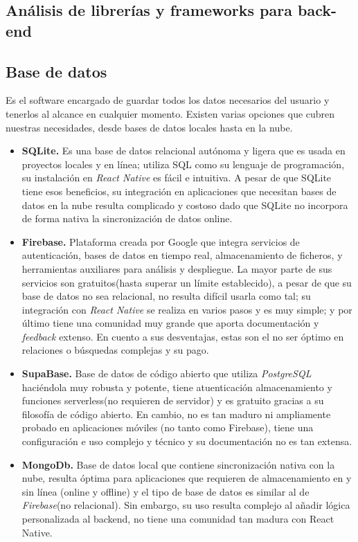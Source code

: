 \documentclass[twoside, openright, 11pt]{report}
\begin{document}
\begin{enumerate}
  
	\section{Análisis de librerías y frameworks para back-end}
		
		\subsection{Base de datos}
		Es el software encargado de guardar todos los datos necesarios del usuario y tenerlos al alcance en cualquier momento. Existen varias opciones que cubren nuestras necesidades, desde bases de datos locales hasta en la nube.
		\begin{itemize}
			\item \textbf{SQLite.} Es una base de datos relacional autónoma y ligera que es usada en proyectos locales y en línea; utiliza SQL como su lenguaje de programación, su instalación en \textit{React Native} es fácil e intuitiva. A pesar de que SQLite tiene esos beneficios, su integración en aplicaciones que necesitan bases de datos en la nube resulta complicado y costoso dado que SQLite no incorpora de forma nativa la sincronización de datos online.
			\item \textbf{Firebase.} Plataforma creada por Google que integra servicios de autenticación, bases de datos en tiempo real, almacenamiento de ficheros, y herramientas auxiliares para análisis y despliegue. La mayor parte de sus servicios son gratuitos(hasta superar un límite establecido), a pesar de que su base de datos no sea relacional, no resulta difícil usarla como tal; su integración con \textit{React Native} se realiza en varios pasos y es muy simple; y por último tiene una comunidad muy grande que aporta documentación y \textit{feedback} extenso. En cuento a sus desventajas, estas son el no ser óptimo en relaciones o búsquedas complejas y su pago.
			\item \textbf{SupaBase. } Base de datos de código abierto que utiliza 
			\textit{PostgreSQL} haciéndola muy robusta y potente, tiene atuenticación almacenamiento y funciones serverless(no requieren de servidor) y es gratuito gracias a su filosofía de código abierto. En cambio, no es tan maduro ni ampliamente probado en aplicaciones móviles (no tanto como Firebase), tiene una configuración e uso complejo y técnico y su documentación no es tan extensa.
			\item \textbf{MongoDb. } Base de datos local que contiene sincronización nativa con la nube, resulta óptima para aplicaciones que requieren de almacenamiento en y sin línea (online y offline) y el tipo de base de datos es similar al de \textit{Firebase}(no relacional). Sin embargo, su uso resulta complejo al añadir lógica personalizada al backend, no tiene una comunidad tan madura con React Native.
		\end{itemize}
	

\end{enumerate}
\end{document}
